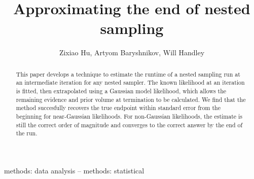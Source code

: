 \documentclass[usenatbib]{mnras} %
\title[Approximating the end of nested sampling]{Approximating the end of nested sampling}
\author[Z. Hu et. al]{Zixiao Hu, Artyom Baryshnikov, Will Handley}
\begin{document}
\label{firstpage}
\pagerange{\pageref{firstpage}--\pageref{lastpage}}
\maketitle


\begin{abstract}
This paper develops a technique to estimate the runtime of a nested sampling run at an intermediate iteration for any nested sampler. The known likelihood at an iteration is fitted, then extrapolated using a Gaussian model likelihood, which allows the remaining evidence and prior volume at termination to be calculated. We find that the method succesfully recovers the true endpoint within standard error from the beginning for near-Gaussian likelihoods. For non-Gaussian likelihoods, the estimate is still the correct order of magnitude and converges to the correct answer by the end of the run. 
\end{abstract}

\begin{keywords}
methods: data analysis -- methods: statistical
\end{keywords}
\end{document}
